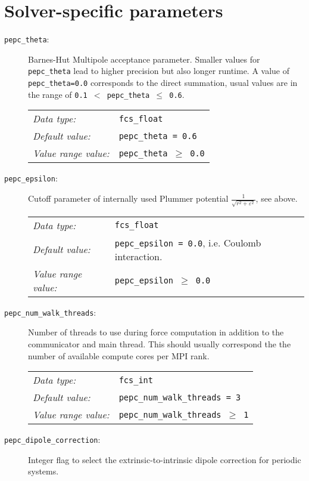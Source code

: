 \section*{Solver-specific parameters}

\begin{description}
  \item[\texttt{pepc\_theta}:] Barnes-Hut Multipole acceptance parameter. Smaller values for 
	\texttt{pepc\_theta} lead to higher precision but also longer runtime. A value of
	\texttt{pepc\_theta=0.0} corresponds to the direct  summation, usual values 
	are in the range of \texttt{0.1 $<$ pepc\_theta $\leq$ 0.6}.

	\begin{tabular}{ll}
	   \textit{Data type:}         & \texttt{fcs\_float} \\
	   \textit{Default value:}     & \texttt{pepc\_theta = 0.6} \\
	   \textit{Value range value:} & \texttt{pepc\_theta $\geq$ 0.0}
	\end{tabular}

  \item[\texttt{pepc\_epsilon}:] Cutoff parameter of internally used Plummer potential 
	$\frac{1}{\sqrt{r^2+\varepsilon^2}}$, see above.
	
	\begin{tabular}{ll}
	   \textit{Data type:}         & \texttt{fcs\_float} \\
	   \textit{Default value:}     & \texttt{pepc\_epsilon = 0.0}, i.e. Coulomb interaction. \\
	   \textit{Value range value:} & \texttt{pepc\_epsilon $\geq$ 0.0}
	\end{tabular}

  \item[\texttt{pepc\_num\_walk\_threads}:] Number of threads to use during force computation in 
	addition to the communicator and main thread. This should usually correspond the the number of
	available compute cores per MPI rank.

	\begin{tabular}{ll}
	   \textit{Data type:}         & \texttt{fcs\_int} \\
	   \textit{Default value:}     & \texttt{pepc\_num\_walk\_threads = 3} \\
	   \textit{Value range value:} & \texttt{pepc\_num\_walk\_threads $\geq$ 1}
	\end{tabular}

  \item[\texttt{pepc\_dipole\_correction}:] Integer flag to select the extrinsic-to-intrinsic
	dipole correction for periodic systems.
    

\end{description}
